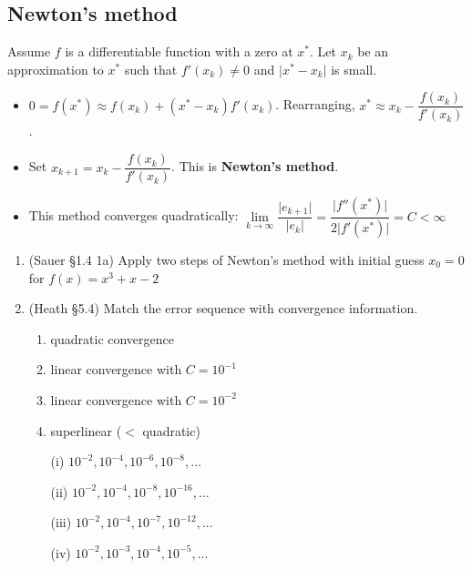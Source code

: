 \documentclass[12pt,letterpaper,noanswers]{exam}
\begin{document}
\subsection*{Newton's method}
\begin{tcolorbox}
Assume $f$ is a differentiable function with a zero at $x^*$.  Let $x_k$ be an approximation to $x^*$ such that $f'(x_k)\neq 0$ and $\vert x^*-x_k\vert$ is small.
\begin{itemize}
\itemsep0pt
    \item $ 0 = f(x^*) \approx f(x_k) + (x^*-x_k)f'(x_k)$.  Rearranging, $x^* \approx x_k - \dfrac{f(x_k)}{f'(x_k)}$.
    \item Set $x_{k+1} = x_k - \dfrac{f(x_k)}{f'(x_k)}$.  This is \textbf{Newton's method}.
    \item This method converges quadratically: $\lim\limits_{k\rightarrow\infty} \dfrac{\vert e_{k+1}\vert }{\vert e_k\vert } = \dfrac{\vert f''(x^*)\vert}{2\vert f'(x^*)\vert} = C < \infty$
\end{itemize}
\end{tcolorbox}
\begin{enumerate}[resume=classQ]
    \item (Sauer \S1.4 1a) Apply two steps of Newton's method with initial guess $x_0 = 0$ for $f(x) = x^3+x-2$
    \vspace{1in}
    
    \item (Heath \S 5.4) Match the error sequence with convergence information.
    
    \begin{enumerate}
    \item quadratic convergence
    \item linear convergence with $C = 10^{-1}$
    \item linear convergence with $C = 10^{-2}$
    \item superlinear ($<$ quadratic)
    \end{enumerate}
    
    \begin{enumerate}
    \item[(i)] $10^{-2},10^{-4},10^{-6},10^{-8},...$
    \item[(ii)] $10^{-2},10^{-4},10^{-8},10^{-16},...$
    \item[(iii)] $10^{-2},10^{-4},10^{-7},10^{-12},...$
    \item[(iv)] $10^{-2},10^{-3},10^{-4},10^{-5},...$
    \end{enumerate}
\end{enumerate}
\end{document}
